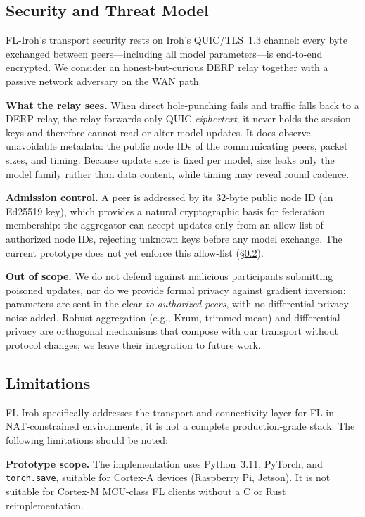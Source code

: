 \documentclass[a4paper,fleqn]{cas-dc}
\begin{document}
\subsection{Security and Threat Model}
\label{sec:threat}

FL-Iroh's transport security rests on Iroh's QUIC/TLS~1.3 channel: every byte exchanged between peers---including all model parameters---is end-to-end encrypted. We consider an honest-but-curious DERP relay together with a passive network adversary on the WAN path.

\textbf{What the relay sees.} When direct hole-punching fails and traffic falls back to a DERP relay, the relay forwards only QUIC \emph{ciphertext}; it never holds the session keys and therefore cannot read or alter model updates. It does observe unavoidable metadata: the public node IDs of the communicating peers, packet sizes, and timing. Because update size is fixed per model, size leaks only the model family rather than data content, while timing may reveal round cadence.

\textbf{Admission control.} A peer is addressed by its 32-byte public node ID (an Ed25519 key), which provides a natural cryptographic basis for federation membership: the aggregator can accept updates only from an allow-list of authorized node IDs, rejecting unknown keys before any model exchange. The current prototype does not yet enforce this allow-list (\S\ref{sec:limitations}).

\textbf{Out of scope.} We do not defend against malicious participants submitting poisoned updates, nor do we provide formal privacy against gradient inversion: parameters are sent in the clear \emph{to authorized peers}, with no differential-privacy noise added. Robust aggregation (e.g., Krum, trimmed mean) and differential privacy are orthogonal mechanisms that compose with our transport without protocol changes; we leave their integration to future work.

\subsection{Limitations}
\label{sec:limitations}

FL-Iroh specifically addresses the transport and connectivity layer for FL in NAT-constrained environments; it is not a complete production-grade stack. The following limitations should be noted:

\textbf{Prototype scope.} The implementation uses Python~3.11, PyTorch, and \texttt{torch.save}, suitable for Cortex-A devices (Raspberry Pi, Jetson). It is not suitable for Cortex-M MCU-class FL clients without a C or Rust reimplementation.
\end{document}

